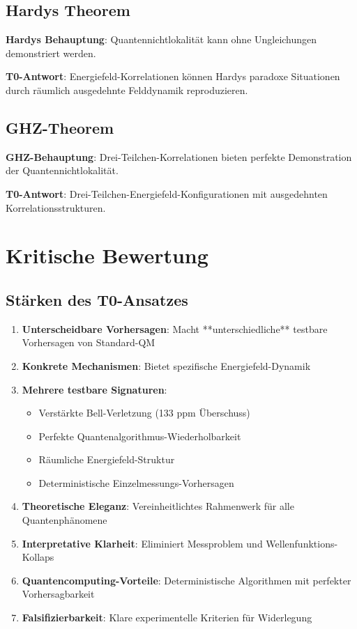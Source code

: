 \documentclass[12pt,a4paper]{article}
\begin{document}
	\subsection{Hardys Theorem}
	
	\textbf{Hardys Behauptung}: Quantennichtlokalität kann ohne Ungleichungen demonstriert werden.
	
	\textbf{T0-Antwort}: Energiefeld-Korrelationen können Hardys paradoxe Situationen durch räumlich ausgedehnte Felddynamik reproduzieren.
	
	\subsection{GHZ-Theorem}
	
	\textbf{GHZ-Behauptung}: Drei-Teilchen-Korrelationen bieten perfekte Demonstration der Quantennichtlokalität.
	
	\textbf{T0-Antwort}: Drei-Teilchen-Energiefeld-Konfigurationen mit ausgedehnten Korrelationsstrukturen.
	
	\section{Kritische Bewertung}
	
	\subsection{Stärken des T0-Ansatzes}
	
	\begin{enumerate}
		\item \textbf{Unterscheidbare Vorhersagen}: Macht **unterschiedliche** testbare Vorhersagen von Standard-QM
		\item \textbf{Konkrete Mechanismen}: Bietet spezifische Energiefeld-Dynamik
		\item \textbf{Mehrere testbare Signaturen}: 
		\begin{itemize}
			\item Verstärkte Bell-Verletzung (133 ppm Überschuss)
			\item Perfekte Quantenalgorithmus-Wiederholbarkeit  
			\item Räumliche Energiefeld-Struktur
			\item Deterministische Einzelmessungs-Vorhersagen
		\end{itemize}
		\item \textbf{Theoretische Eleganz}: Vereinheitlichtes Rahmenwerk für alle Quantenphänomene
		\item \textbf{Interpretative Klarheit}: Eliminiert Messproblem und Wellenfunktions-Kollaps
		\item \textbf{Quantencomputing-Vorteile}: Deterministische Algorithmen mit perfekter Vorhersagbarkeit
		\item \textbf{Falsifizierbarkeit}: Klare experimentelle Kriterien für Widerlegung
	\end{enumerate}
	
\end{document}
